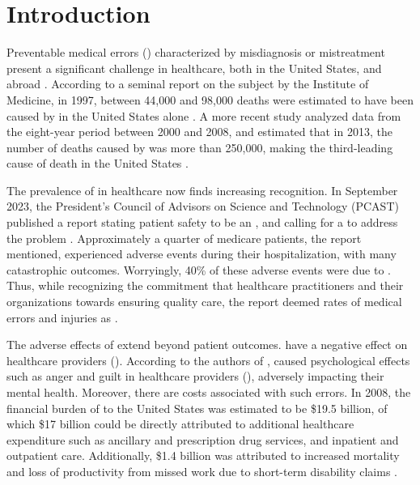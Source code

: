 \chapter{Introduction}\label{chapter:introduction}

Preventable medical errors (\PMEs{}) characterized by misdiagnosis or mistreatment present
a significant challenge in healthcare, both in the United States, and abroad \cite{RodziewiczStatsPearls18}.
According to a seminal report on the subject by the Institute of Medicine, in 1997,
between 44,000 and 98,000 deaths were estimated to have been caused by \PMEs{} in
the United States alone \cite{DonaldsonBook00}.
A more recent study analyzed data from the eight-year
period between 2000 and 2008, and estimated that in 2013, the number of deaths
caused by \PMEs{} was more than 250,000, making \PMEs{} the third-leading
cause of death in the United States \cite{MakaryBMJ16}.

The prevalence of \PMEs{} in healthcare now finds increasing recognition.
In September 2023, the President's Council of Advisors on Science and
Technology (PCAST) published a report stating
patient safety to be an , and calling
for a  to address the problem \cite{PCAST23}.
Approximately a quarter of medicare
patients, the report mentioned, experienced adverse events during their hospitalization, with
many catastrophic outcomes. Worryingly, 40\% of these adverse events were
due to \PMEs{}. Thus, while recognizing the commitment that
healthcare practitioners and their organizations towards ensuring quality
care, the report deemed rates of medical errors and injuries as .

The adverse effects of \PMEs{} extend beyond patient outcomes.
\PMEs{} have a negative effect on healthcare providers (\HCPs). According to the authors of
\cite{RodziewiczStatsPearls18}, \PMEs{} caused psychological effects such
as anger and guilt in healthcare providers (\HCPs{}), adversely impacting their mental
health. Moreover, there are costs associated with such errors.
In 2008, the financial burden of \PMEs{} to the United States was
estimated to be \$19.5 billion, of which \$17 billion could be
directly attributed to additional healthcare expenditure such as
ancillary and prescription drug services, and inpatient and outpatient care.
Additionally, \$1.4 billion was attributed to increased mortality and loss
of productivity from missed work due to short-term disability claims \cite{AndelJHCF12}.

